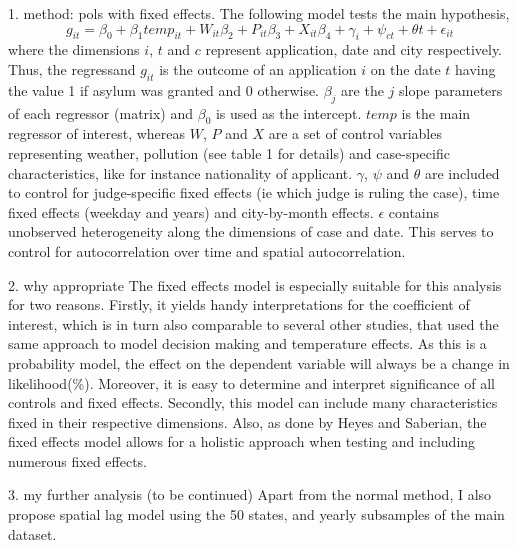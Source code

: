 \documentclass[11pt]{article}
\begin{document}
	1. method: pols with fixed effects.
	The following model tests the main hypothesis, 
	\newline
	\begin{equation}
		g_{ it } = \beta_{0} + \beta_{1 }temp_{it} + W_{it}\beta_{2} + P_{it}\beta_{3} + X_{it}\beta_{4} + \gamma_{i} + \psi_{ct} + \theta{t} + \epsilon_{it}
	\end{equation}
	where the dimensions \(i\), \(t\) and \(c\) represent application, date and city respectively. Thus, the regressand \(g_{ it }\) is the outcome of an application \(i\) on the date \(t\) having the value 1 if asylum was granted and 0 otherwise. \(\beta_{j}\) are the \(j\) slope parameters of each regressor (matrix) and \(\beta_{0}\) is used as the intercept. \(temp\) is the main regressor of interest, whereas \(W\), \(P\) and \(X\) are a set of control variables representing weather, pollution (see table 1 for details) and case-specific characteristics, like for instance nationality of applicant. \(\gamma\), \(\psi\) and \(\theta\) are included to control for judge-specific fixed effects (ie which judge is ruling the case), time fixed effects (weekday and years) and city-by-month effects. \(\epsilon\) contains unobserved heterogeneity along the dimensions of case and date. This serves to control for autocorrelation over time and spatial autocorrelation. 

	2. why appropriate
	The fixed effects model is especially suitable for this analysis for two reasons. Firstly, it yields handy interpretations for the coefficient of interest, which is in turn also comparable to several other studies, that used the same approach to model decision making and temperature effects. As this is a probability model, the effect on the dependent variable will always be a change in likelihood(\%). Moreover, it is easy to determine and interpret significance of all controls and fixed effects. Secondly, this model can include many characteristics fixed in their respective dimensions. Also, as done by Heyes and Saberian, the fixed effects model allows for a holistic approach when testing and including numerous fixed effects.
		
	3. my further analysis (to be continued)
	Apart from the normal method, I also propose spatial lag model using the 50 states, and yearly subsamples of the main dataset.
	
\end{document}
